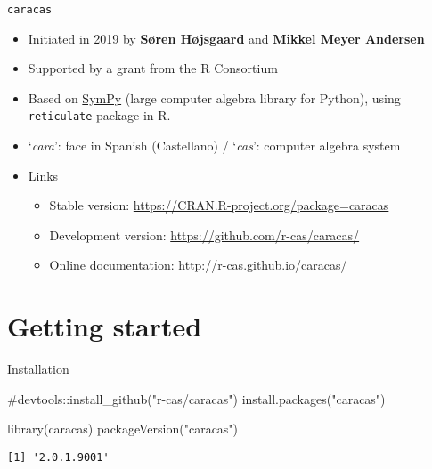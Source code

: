 \documentclass[
  ignorenonframetext,
]{beamer}
\newenvironment{Shaded}{\begin{snugshade}}{\end{snugshade}}
\newcommand{\CommentTok}[1]{\textcolor[rgb]{0.37,0.37,0.37}{#1}}
\newcommand{\FunctionTok}[1]{\textcolor[rgb]{0.28,0.35,0.67}{#1}}
\newcommand{\NormalTok}[1]{\textcolor[rgb]{0.00,0.23,0.31}{#1}}
\newcommand{\StringTok}[1]{\textcolor[rgb]{0.13,0.47,0.30}{#1}}
\providecommand{\tightlist}{%
  \setlength{\itemsep}{0pt}\setlength{\parskip}{0pt}}\usepackage{longtable,booktabs,array}
\begin{document}
\begin{frame}[fragile]{\texttt{caracas}}
\begin{itemize}
\item
  Initiated in 2019 by \textbf{Søren Højsgaard} and \textbf{Mikkel Meyer
  Andersen}
\item
  Supported by a grant from the R Consortium
\item
  Based on \href{https://www.sympy.org/}{SymPy} (large computer algebra
  library for Python), using \texttt{reticulate} package in R.
\item
  `\emph{cara}': face in Spanish (Castellano) / `\emph{cas}': computer
  algebra system
\item
  Links

  \begin{itemize}
  \tightlist
  \item
    Stable version: \url{https://CRAN.R-project.org/package=caracas}
  \item
    Development version: \url{https://github.com/r-cas/caracas/}
  \item
    Online documentation: \url{http://r-cas.github.io/caracas/}
  \end{itemize}
\end{itemize}
\end{frame}

\hypertarget{getting-started}{%
\section{Getting started}\label{getting-started}}

\begin{frame}[fragile]{Installation}
\protect\hypertarget{installation}{}
\begin{Shaded}
\begin{Highlighting}[]
\CommentTok{\#devtools::install\_github("r{-}cas/caracas")}
\FunctionTok{install.packages}\NormalTok{(}\StringTok{"caracas"}\NormalTok{)}
\end{Highlighting}
\end{Shaded}

\begin{Shaded}
\begin{Highlighting}[]
\FunctionTok{library}\NormalTok{(caracas)}
\FunctionTok{packageVersion}\NormalTok{(}\StringTok{"caracas"}\NormalTok{)}
\end{Highlighting}
\end{Shaded}

\begin{verbatim}
[1] '2.0.1.9001'
\end{verbatim}
\end{frame}
\end{document}
